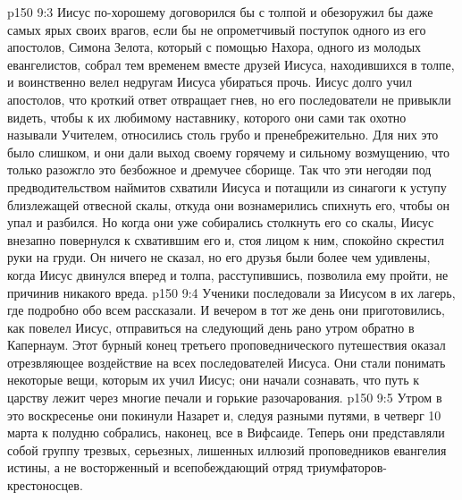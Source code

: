 \vs p150 9:3 Иисус по\hyp{}хорошему договорился бы с толпой и обезоружил бы даже самых ярых своих врагов, если бы не опрометчивый поступок одного из его апостолов, Симона Зелота, который с помощью Нахора, одного из молодых евангелистов, собрал тем временем вместе друзей Иисуса, находившихся в толпе, и воинственно велел недругам Иисуса убираться прочь. Иисус долго учил апостолов, что кроткий ответ отвращает гнев, но его последователи не привыкли видеть, чтобы к их любимому наставнику, которого они сами так охотно называли Учителем, относились столь грубо и пренебрежительно. Для них это было слишком, и они дали выход своему горячему и сильному возмущению, что только разожгло это безбожное и дремучее сборище. Так что эти негодяи под предводительством наймитов схватили Иисуса и потащили из синагоги к уступу близлежащей отвесной скалы, откуда они вознамерились спихнуть его, чтобы он упал и разбился. Но когда они уже собирались столкнуть его со скалы, Иисус внезапно повернулся к схватившим его и, стоя лицом к ним, спокойно скрестил руки на груди. Он ничего не сказал, но его друзья были более чем удивлены, когда Иисус двинулся вперед и толпа, расступившись, позволила ему пройти, не причинив никакого вреда.
\vs p150 9:4 Ученики последовали за Иисусом в их лагерь, где подробно обо всем рассказали. И вечером в тот же день они приготовились, как повелел Иисус, отправиться на следующий день рано утром обратно в Капернаум. Этот бурный конец третьего проповеднического путешествия оказал отрезвляющее воздействие на всех последователей Иисуса. Они стали понимать некоторые вещи, которым их учил Иисус; они начали сознавать, что путь к царству лежит через многие печали и горькие разочарования.
\vs p150 9:5 Утром в это воскресенье они покинули Назарет и, следуя разными путями, в четверг 10 марта к полудню собрались, наконец, все в Вифсаиде. Теперь они представляли собой группу трезвых, серьезных, лишенных иллюзий проповедников евангелия истины, а не восторженный и всепобеждающий отряд триумфаторов\hyp{}крестоносцев.
